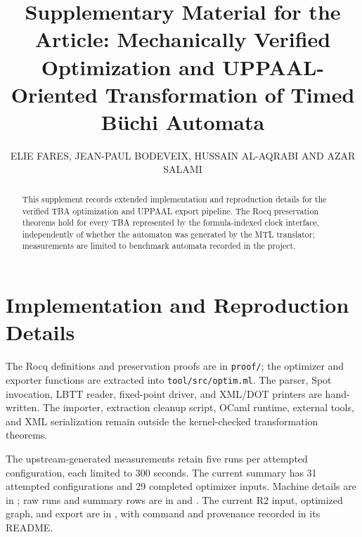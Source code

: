 \documentclass{ieeeaccess}
\begin{document}
\history{}
\doi{}
\title{Supplementary Material for the Article: Mechanically Verified Optimization and UPPAAL-Oriented Transformation of Timed B\"uchi Automata}
\author{\uppercase{Elie Fares},
\uppercase{Jean-Paul Bodeveix},
\uppercase{Hussain Al-Aqrabi} AND
\uppercase{Azar Salami}}
\address[1]{Higher Colleges of Technology, Sharjah, United Arab Emirates (e-mail: efares@hct.ac.ae, halaqrabi@hct.ac.ae, asalami@hct.ac.ae)}
\address[2]{IRIT, UPS, Universit\'e de Toulouse, France (e-mail: bodeveix@irit.fr)}
\begin{abstract}
This supplement records extended implementation and reproduction details for the verified TBA optimization and UPPAAL export pipeline. The Rocq preservation theorems hold for every TBA represented by the formula-indexed clock interface, independently of whether the automaton was generated by the MTL translator; measurements are limited to benchmark automata recorded in the project.
\end{abstract}
\titlepgskip=-15pt
\maketitle




\section{Implementation and Reproduction Details}
\label{sec:supp-implementation}
The Rocq definitions and preservation proofs are in \texttt{proof/}; the optimizer and exporter functions are extracted into \texttt{tool/src/optim.ml}. The parser, Spot invocation, LBTT reader, fixed-point driver, and XML/DOT printers are hand-written. The importer, extraction cleanup script, OCaml runtime, external tools, and XML serialization remain outside the kernel-checked transformation theorems.

The upstream-generated measurements retain five runs per attempted configuration, each limited to 300 seconds. The current summary has 31 attempted configurations and 29 completed optimizer inputs. Machine details are in ; raw runs and summary rows are in  and . The current R2 input, optimized graph, and export are in , with command and provenance recorded in its README.
\end{document}
